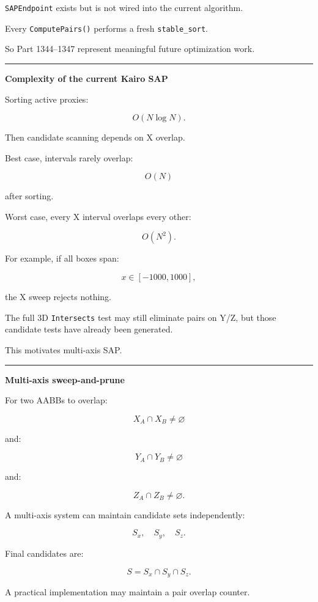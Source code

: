 \texttt{SAPEndpoint} exists but is not wired into the current algorithm.

Every \texttt{ComputePairs()} performs a fresh \texttt{stable\_sort}.

So Part 1344--1347 represent meaningful future optimization work.

\begin{center}\rule{0.5\linewidth}{0.5pt}\end{center}

\textbf{Complexity of the current Kairo SAP}

Sorting active proxies:

\[
O(N\log N).
\]

Then candidate scanning depends on X overlap.

Best case, intervals rarely overlap:

\[
O(N)
\]

after sorting.

Worst case, every X interval overlaps every other:

\[
O(N^2).
\]

For example, if all boxes span:

\[
x\in[-1000,1000],
\]

the X sweep rejects nothing.

The full 3D \texttt{Intersects} test may still eliminate pairs on Y/Z, but those candidate tests have already been generated.

This motivates multi-axis SAP.

\begin{center}\rule{0.5\linewidth}{0.5pt}\end{center}

\textbf{Multi-axis sweep-and-prune}

For two AABBs to overlap:

\[
X_A\cap X_B\ne\varnothing
\]

and:

\[
Y_A\cap Y_B\ne\varnothing
\]

and:

\[
Z_A\cap Z_B\ne\varnothing.
\]

A multi-axis system can maintain candidate sets independently:

\[
S_x,\quad S_y,\quad S_z.
\]

Final candidates are:

\[
\boxed{
S=S_x\cap S_y\cap S_z.
}
\]

A practical implementation may maintain a pair overlap counter.

